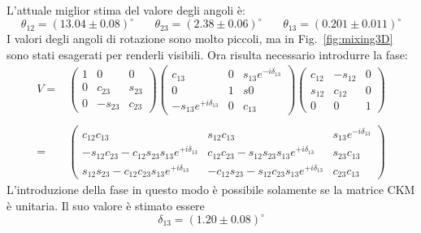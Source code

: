 \documentclass{subnucbo}
\begin{document}
L'attuale miglior stima del valore degli angoli è:
\begin{equation}
        \theta_{12}=(13.04\pm0.08)^{\circ}\,\,\,\,\,\,\,\,\,\,\,\theta_{23}=(2.38\pm0.06)^{\circ}\,\,\,\,\,\,\,\,\,\,\,\theta_{13}=(0.201\pm0.011)^{\circ}
\end{equation}
I valori degli angoli di rotazione sono molto piccoli, ma in Fig.~\ref{fig:mixing3D} sono stati esagerati per renderli visibili.
Ora risulta necessario introdurre la fase:
\begin{equation}
        \begin{aligned}
                V= &
                \begin{pmatrix}1 & 0 & 0\\0 & c_{23} & s_{23}\\0 & -s_{23} & c_{23}\end{pmatrix}
                \begin{pmatrix}c_{13} & 0 & s_{13}e^{-i\delta_{13}}\\0 & 1 & s0\\-s_{13}e^{+i\delta_{13}} & 0 & c_{13}\end{pmatrix}
                \begin{pmatrix}c_{12} & -s_{12} & 0\\s_{12} & c_{12} & 0\\0 & 0 & 1\end{pmatrix}\\
                \\
                = &
                \begin{pmatrix}
                c_{12}c_{13} & s_{12}c_{13} & s_{13}e^{-i\delta_{13}}\\
                -s_{12}c_{23}-c_{12}s_{23}s_{13}e^{+i\delta_{13}} & c_{12}c_{23}-s_{12}s_{23}s_{13}e^{+i\delta_{13}} & s_{23}c_{13}\\
                s_{12}s_{23}-c_{12}c_{23}s_{13}e^{+i\delta_{13}} & -c_{12}s_{23}-s_{12}c_{23}s_{13}e^{+i\delta_{13}} & c_{23}c_{13}
                \end{pmatrix}
        \end{aligned}
\end{equation}
L'introduzione della fase in questo modo è possibile solamente se la matrice CKM è unitaria. Il suo valore è stimato essere
\begin{equation}
        \delta_{13}=(1.20\pm0.08)^{\circ}
\end{equation}
\end{document}
